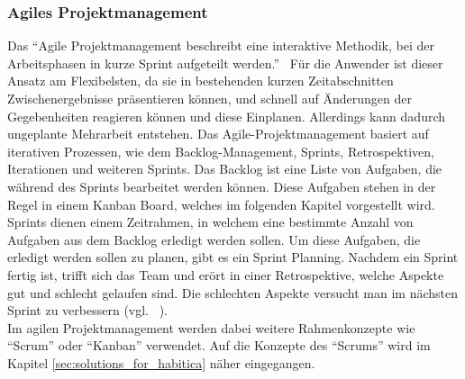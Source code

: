 \documentclass[sigconf, nonacm]{acmart}
\begin{document}
\subsubsection{Agiles Projektmanagement}
Das \enquote{Agile Projektmanagement beschreibt eine interaktive Methodik, bei der Arbeitsphasen in kurze Sprint aufgeteilt werden.}~\cite{asana_kanban_nodate} Für die Anwender ist dieser Ansatz am Flexibelsten, da sie in bestehenden kurzen Zeitabschnitten Zwischenergebnisse präsentieren können, und schnell auf Änderungen der Gegebenheiten reagieren können und diese Einplanen. Allerdings kann dadurch ungeplante Mehrarbeit entstehen.
Das Agile-Projektmanagement basiert auf iterativen Prozessen, wie dem Backlog-Management, Sprints, Retrospektiven, Iterationen und weiteren Sprints.
Das Backlog ist eine Liste von Aufgaben, die während des Sprints bearbeitet werden können. Diese Aufgaben stehen in der Regel in einem Kanban Board, welches im folgenden Kapitel vorgestellt wird. Sprints dienen einem Zeitrahmen, in welchem eine bestimmte Anzahl von Aufgaben aus dem Backlog erledigt werden sollen. Um diese Aufgaben, die erledigt werden sollen zu planen, gibt es ein Sprint Planning. Nachdem ein Sprint fertig ist, trifft sich das Team und erört in einer Retrospektive, welche Aspekte gut und schlecht gelaufen sind. Die schlechten Aspekte versucht man im nächsten Sprint zu verbessern (vgl. ~\cite{asana_kanban_nodate}).
\\
Im agilen Projektmanagement werden dabei weitere Rahmenkonzepte wie \enquote{Scrum} oder \enquote{Kanban} verwendet. Auf die Konzepte des \enquote{Scrums} wird im Kapitel \ref{sec:solutions_for_habitica} näher eingegangen.
\end{document}
